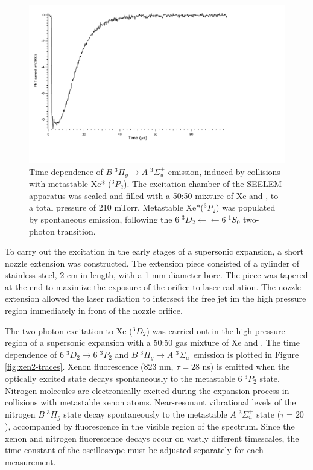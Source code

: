 \documentclass[12pt]{mitthesis}
\begin{document}
\begin{figure}
  \caption{Time dependence of  $B \; ^3\Pi_g \rightarrow A \; ^3\Sigma_u^+$ emission,
    induced by collisions with metastable Xe* ($^3P_2$).  The
    excitation chamber of the SEELEM apparatus was sealed and filled
    with a 50:50 mixture of Xe and , to a total pressure of 210
    mTorr.  Metastable Xe*($^3P_2$) was populated by spontaneous
    emission, following the $6\;^3D_2 \leftarrow \leftarrow 6\;^1S_0$
    two-photon transition.}
  \label{fig:xen2-firstlight}
  \vspace{1cm}
  \centering
  \includegraphics[width=7in]{XeN2-firstlight.pdf}
  \vspace{2in}
\end{figure}

To carry out the excitation in the early stages of a supersonic
expansion, a short nozzle extension was constructed.  The extension
piece consisted of a cylinder of stainless steel, 2 cm in length, with
a 1 mm diameter bore.  The piece was tapered at the end to maximize
the exposure of the orifice to laser radiation.  The nozzle extension
allowed the laser radiation to intersect the free jet im the high
pressure region immediately in front of the nozzle orifice.

The two-photon excitation to Xe ($^3D_2$) was carried out in the
high-pressure region of a supersonic expansion with a 50:50 gas
mixture of Xe and .  The time dependence of  $6\;^3D_2
\rightarrow 6\;^3P_2$ and  $B \; ^3\Pi_g \rightarrow A \; ^3\Sigma_u^+$
emission is plotted in Figure \ref{fig:xen2-traces}.  Xenon
fluorescence (823 nm, $\tau=28$ ns) is emitted when the optically
excited state decays spontaneously to the metastable $6\;^3P_2$ state.
Nitrogen molecules are electronically excited during the expansion
process in collisions with metastable xenon atoms.  Near-resonant
vibrational levels of the nitrogen $B \; ^3\Pi_g$ state decay
spontaneously to the metastable $A \; ^3\Sigma_u^+$ state ($\tau=20$
\microsec), accompanied by fluorescence in the visible region of the
spectrum.  Since the xenon and nitrogen fluorescence decays occur on
vastly different timescales, the time constant of the oscilloscope
must be adjusted separately for each measurement.
\end{document}
